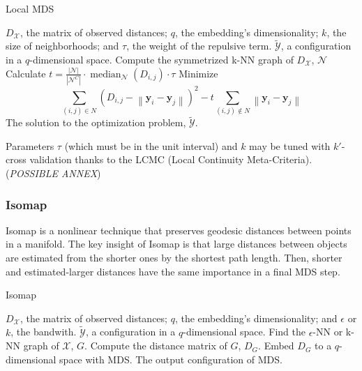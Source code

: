 \begin{algorithm}
    \caption{Local MDS}
    \label{alg:LocalMDS}
    
    \begin{algorithmic}[1]
    \REQUIRE $D_{\mathcal{X}}$, the matrix of observed distances; $q$, the embedding's dimensionality; $k$, the size of neighborhoods; and $\tau$, the weight of the repulsive term.
    \ENSURE $\tilde{\mathcal{Y}}$, a configuration in a $q$-dimensional space.
    \STATE Compute the symmetrized k-NN graph of $D_{\mathcal{X}}$, $\mathcal{N}$
    \STATE Calculate $t=\frac{|\mathcal{N}|}{\left|\mathcal{N}^C\right|} \cdot \operatorname{median}_{\mathcal{N}}\left(D_{i, j}\right) \cdot \tau$
    \STATE Minimize $$\sum_{(i, j) \in N}\left(D_{i, j}-\left\|\mathbf{y}_i-\mathbf{y}_j\right\|\right)^2 - t \sum_{(i, j) \notin N}\left\|\mathbf{y}_i-\mathbf{y}_j\right\|$$
    \RETURN The solution to the optimization problem, $\tilde{\mathcal{Y}}$.
    \end{algorithmic}
\end{algorithm}

Parameters $\tau$ (which must be in the unit interval) and $k$ may be tuned with $k'$-cross validation thanks to the LCMC (Local Continuity Meta-Criteria). (\textit{POSSIBLE ANNEX})

\subsubsection{Isomap}

Isomap \cite{Tenenbaum2000} is a nonlinear technique that preserves geodesic distances between points in a manifold. The key insight of Isomap is that large distances between objects are estimated from the shorter ones by the shortest path length. Then, shorter and estimated-larger distances have the same importance in a final MDS step.

\begin{algorithm}
    \caption{Isomap}
    \label{alg:Isomap}

    \begin{algorithmic}[1]
    \REQUIRE $D_{\mathcal{X}}$, the matrix of observed distances; $q$, the embedding's dimensionality; and $\epsilon$ or $k$, the bandwith.
    \ENSURE $\tilde{\mathcal{Y}}$, a configuration in a $q$-dimensional space.
    \STATE Find the $\epsilon$-NN or k-NN graph of $\mathcal{X}$, $G$.
    \STATE Compute the distance matrix of $G$, $D_G$.
    \STATE Embed $D_G$ to a $q$-dimensional space with MDS.
    \RETURN The output configuration of MDS.
    
    \end{algorithmic}
\end{algorithm}

